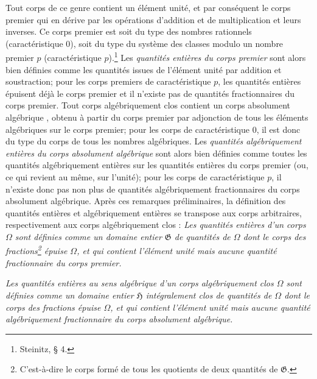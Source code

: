 Tout corps de ce genre contient un élément unité, et par conséquent le \og{} corps premier \fg{} qui en dérive par les opérations d'addition et de multiplication et leurs inverses. Ce corps premier est soit du type des nombres rationnels (caractéristique $0$), soit du type du système des classes modulo un nombre premier $p$ (caractéristique $p$).\footnote{Steinitz, \S{} 4.} Les \emph{quantités entières du corps premier} sont alors bien définies comme les quantités issues de l'élément unité par addition et soustraction; pour les corps premiers de caractéristique $p$, les quantités entières épuisent déjà le corps premier et il n'existe pas de quantités fractionnaires du corps premier. Tout corps algébriquement clos contient un \og{} corps absolument algébrique \fg{}, obtenu à partir du corps premier par adjonction de tous les éléments algébriques sur le corps premier; pour les corps de caractéristique $0$, il est donc du type du corps de tous les nombres algébriques. Les \emph{quantités algébriquement entières du corps absolument algébrique} sont alors bien définies comme toutes les quantités algébriquement entières sur les quantités entières du corps premier (ou, ce qui revient au même, sur l'unité); pour les corps de caractéristique $p$, il n'existe donc pas non plus de quantités algébriquement fractionnaires du corps absolument algébrique. Après ces remarques préliminaires, la définition des quantités \og{} entières \fg{} et \og{} algébriquement entières \fg{} se transpose aux corps arbitraires, respectivement aux corps algébriquement clos : \emph{Les quantités entières d'un corps $\Omega$ sont définies comme un domaine entier $\mathfrak G$ de quantités de $\Omega$ dont le corps des fractions\footnote{C'est-à-dire le corps formé de tous les quotients de deux quantités de $\mathfrak G$.} épuise $\Omega$, et qui contient l'élément unité mais aucune quantité fractionnaire du corps premier.}

\emph{Les quantités entières au sens algébrique d'un corps algébriquement clos $\Omega$ sont définies comme un domaine entier $\mathfrak H$ intégralement clos de quantités de $\Omega$ dont le corps des fractions épuise $\Omega$, et qui contient l'élément unité mais aucune quantité algébriquement fractionnaire du corps absolument algébrique.}

